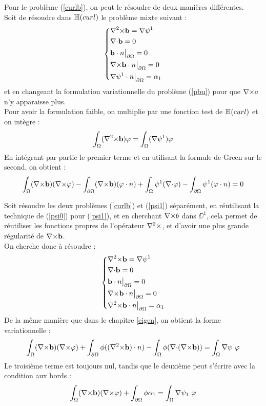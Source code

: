 Pour le problème (\ref{curlb}), on peut le résoudre de deux manières différentes.\\
Soit de résoudre dans ${\mathbb{H}}(curl)$ le problème mixte suivant : 
\begin{equation}
\label{pbbcurl}
\left\{
\begin{aligned}
&{\nabla^2\times} \mathbf{b} = {\nabla}\psi^1\\
&{\nabla\cdot} \mathbf{b} = 0\\
&\mathbf{b}\cdot n{\big\rvert_{\partial\Omega}} = 0\\
&{\nabla\times} \mathbf{b}\cdot n{\big\rvert_{\partial\Omega}} = 0\\
&{\nabla}\psi^1\cdot n{\big\rvert_{\partial\Omega}} = \alpha_1
\end{aligned}
\right.
\end{equation}
et en changeant la formulation variationnelle du problème (\ref{pbu}) pour que ${\nabla\times} a$ n'y apparaisse plus.\\
Pour avoir la formulation faible, on multiplie par une fonction test de ${\mathbb{H}}(curl)$ et on intègre :
\[
\int_\Omega ({\nabla^2\times} \mathbf{b}) \varphi = \int_\Omega ({\nabla}\psi^1)\varphi
\]
En intégrant par partie le premier terme et en utilisant la formule de Green sur le second, on obtient :
\begin{equation}
\label{fvbcurl}
\int_\Omega ({\nabla\times} \mathbf{b})({\nabla\times}\varphi) - \int_{\partial\Omega} ({\nabla\times} \mathbf{b})(\varphi\cdot n) +\int_\Omega \psi^1({\nabla\cdot}\varphi) - \int_{\partial\Omega} \psi^1(\varphi\cdot n) = 0
\end{equation}

Soit résoudre les deux problèmes (\ref{curlb}) et (\ref{psi1}) séparément, en réutilisant la technique de (\ref{psi0}) pour (\ref{psi1}), et en cherchant ${\nabla\times} b$ dans $\DD^1$, cela permet de réutiliser les fonctions propres de l'opérateur ${\nabla^2\times}$, et d'avoir une plus grande régularité de ${\nabla\times} \mathbf{b}$.\\
On cherche donc à résoudre :
\[
\left\{
\begin{aligned}
&{\nabla^2\times} \mathbf{b} = {\nabla}\psi^1\\
&{\nabla\cdot} \mathbf{b} = 0\\
&\mathbf{b}\cdot n{\big\rvert_{\partial\Omega}} = 0\\
&{\nabla\times} \mathbf{b}\cdot n{\big\rvert_{\partial\Omega}} = 0\\
&{\nabla^2\times} \mathbf{b}\cdot n{\big\rvert_{\partial\Omega}} = \alpha_1
\end{aligned}
\right.
\]
De la même manière que dans le chapitre \ref{eigen}, on obtient la forme variationnelle :
\[
\int_\Omega (\rot\mathbf{b})(\rot\varphi) + \int_{\partial\Omega} \phi((\rott\mathbf{b})\cdot n) - \int_\Omega \phi(\diverg(\rot \mathbf{b}))  = \int_\Omega \grad\psi\ \varphi
\]
Le troisième terme est toujours nul, tandis que le deuxième peut s'écrire avec la condition aux bords :
\begin{equation}
\label{bd1}
\int_\Omega ({\nabla\times}\mathbf{b})({\nabla\times}\varphi) + \int_{\partial\Omega} \phi\alpha_1 = \int_\Omega {\nabla}\psi_1\ \varphi
\end{equation}

